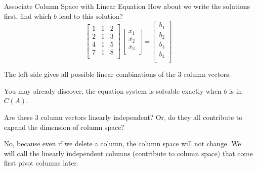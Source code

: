 \documentclass{beamer}
\begin{document}
\begin{frame}{Associate Column Space with Linear Equation}
How about we write the solutions first, find which $b$ lead to this solution?
\begin{equation*}
    \left[ \begin{matrix}
        1&		1&		2\\
        2&		1&		3\\
        4&		1&		5\\
        7&		1&		8\\
    \end{matrix} \right] \left[ \begin{array}{c}
        x_1\\
        x_2\\
        x_3\\
    \end{array} \right] =\left[ \begin{array}{c}
        b_1\\
        b_2\\
        b_3\\
        b_4\\
    \end{array} \right]
\end{equation*}

The left side gives all possible linear combinations of the 3 column vectors.

\vspace{3pt}
You may already discover, the equation system is solvable exactly when $b$ is in $C(A)$.

\vspace{3pt}
Are these 3 column vectors \alert{linearly independent}? Or, do they all contribute to expand the dimension of column space?

\vspace{3pt}
No, because even if we delete a column, the column space will not change. We will call the linearly independent columns (contribute to column space) that come first pivot columns later.
\end{frame}
\end{document}
